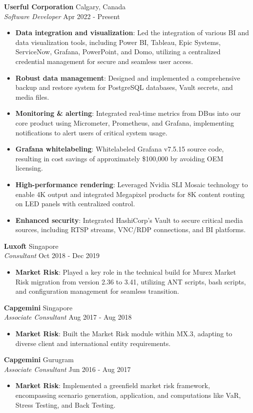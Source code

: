 \documentclass[a4paper]{article}
\newcommand{\resumeHeadingExperience}[4]{
    \textbf{#1} \hfill {#2}\\
    \textit{#3} \hfill {#4}\\
    \vspace{-3mm}
}
\newcommand{\resumeItemExperience}[2]{
  \item{
    \begin{justify}
    \setlength{\rightskip}{0.15in} \textbf{#1}{: #2 \vspace{-2pt}}
    \end{justify}
  }
}
\begin{document}
\resumeHeadingExperience {Userful Corporation} {Calgary, Canada} {Software Developer} {Apr 2022 - Present}
\begin{itemize} \itemsep 1pt
    \resumeItemExperience {Data integration and visualization} {Led the integration of various BI and data visualization tools, including Power BI, Tableau, Epic Systems, ServiceNow, Grafana, PowerPoint, and Domo, utilizing a centralized credential management for secure and seamless user access.}
    \resumeItemExperience {Robust data management} {Designed and implemented a comprehensive backup and restore system for PostgreSQL databases, Vault secrets, and media files.}
    \resumeItemExperience {Monitoring \& alerting} {Integrated real-time metrics from DBus into our core product using Micrometer, Prometheus, and Grafana, implementing notifications to alert users of critical system usage.}
    \resumeItemExperience {Grafana whitelabeling} {Whitelabeled Grafana v7.5.15 source code, resulting in cost savings of approximately \$100,000 by avoiding OEM licensing.}
    \resumeItemExperience {High-performance rendering} {Leveraged Nvidia SLI Mosaic technology to enable 4K output and integrated Megapixel products for 8K content routing on LED panels with centralized control.}
    \resumeItemExperience {Enhanced security} {Integrated HashiCorp's Vault to secure critical media sources, including RTSP streams, VNC/RDP connections, and BI platforms.}
\end{itemize}

\resumeHeadingExperience {Luxoft} {Singapore} {Consultant} {Oct 2018 - Dec 2019}
\begin{itemize} \itemsep 1pt
    \resumeItemExperience{Market Risk} {Played a key role in the technical build for Murex Market Risk migration from version 2.36 to 3.41, utilizing ANT scripts, bash scripts, and configuration management for seamless transition.}
\end{itemize}

\resumeHeadingExperience {Capgemini} {Singapore} {Associate Consultant} {Aug 2017 - Aug 2018}
\begin{itemize} \itemsep 1pt
    \resumeItemExperience{Market Risk} {Built the Market Risk module within MX.3, adapting to diverse client and international entity requirements.}
\end{itemize}

\resumeHeadingExperience {Capgemini} {Gurugram} {Associate Consultant} {Jun 2016 - Aug 2017}
\begin{itemize} \itemsep 1pt
    \resumeItemExperience{Market Risk} {Implemented a greenfield market risk framework, encompassing scenario generation, application, and computations like VaR, Stress Testing, and Back Testing.}
\end{itemize}
\end{document}
